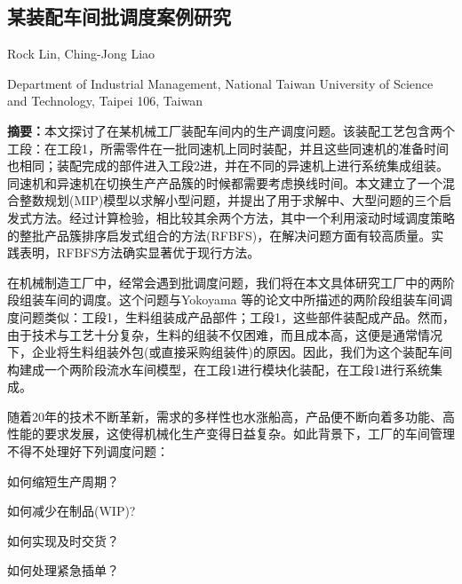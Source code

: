 \begin{Abstract}
\chapter*{某装配车间批调度案例研究}
\begin{center}
\vspace{2mm}
{
 {\xiaosi Rock Lin, Ching-Jong Liao}

 {\xiaowu Department of Industrial Management, National Taiwan University of Science and Technology, Taipei 106, Taiwan}
}
\end{center}
{\songti 
\noindent \xiaowu\textbf{摘要：}本文探讨了在某机械工厂装配车间内的生产调度问题。该装配工艺包含两个工段：在工段1，所需零件在一批同速机上同时装配，并且这些同速机的准备时间也相同；装配完成的部件进入工段2进，并在不同的异速机上进行系统集成组装。同速机和异速机在切换生产产品簇的时候都需要考虑换线时间。本文建立了一个混合整数规划(MIP)模型以求解小型问题，并提出了用于求解中、大型问题的三个启发式方法。经过计算检验，相比较其余两个方法，其中一个利用滚动时域调度策略的整批产品簇排序启发式组合的方法(RFBFS)，在解决问题方面有较高质量。实践表明，RFBFS方法确实显著优于现行方法。

}
\end{Abstract}
在机械制造工厂中，经常会遇到批调度问题，我们将在本文具体研究工厂中的两阶段组装车间的调度。这个问题与Yokoyama 等的论文中所描述的两阶段组装车间调度问题类似：工段1，生料组装成产品部件；工段1，这些部件装配成产品。然而，由于技术与工艺十分复杂，生料的组装不仅困难，而且成本高，这便是通常情况下，企业将生料组装外包(或直接采购组装件)的原因。因此，我们为这个装配车间构建成一个两阶段流水车间模型，在工段1进行模块化装配，在工段1进行系统集成。

随着20年的技术不断革新，需求的多样性也水涨船高，产品便不断向着多功能、高性能的要求发展，这使得机械化生产变得日益复杂。如此背景下，工厂的车间管理不得不处理好下列调度问题：
\begin{compactenum}[(1)]
\item 如何缩短生产周期？
\item 如何减少在制品(WIP)?
\item 如何实现及时交货？
\item 如何处理紧急插单？
\end{compactenum}